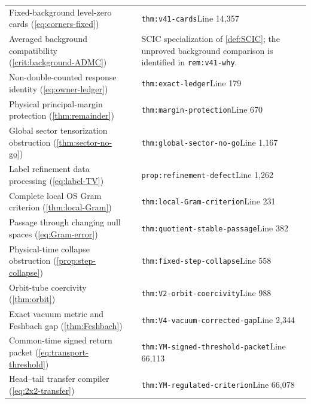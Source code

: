 \documentclass[11pt,oneside,openany]{book}
\theoremstyle{definition}
\theoremstyle{remark}
\begin{document}
\begin{longtable}{L{0.32\textwidth}L{0.12\textwidth}L{0.477\textwidth}}
Fixed-background level-zero cards (\cref{eq:corners-fixed}) & \cite{F11} & \nolinkurl{thm:v41-cards}\newline Line 14,357 \\
Averaged background compatibility (\cref{crit:background-ADMC}) & \cite{F9,F11} & SCIC specialization of \cref{def:SCIC}; the unproved background comparison is identified in \nolinkurl{rem:v41-why}. \\
Non-double-counted response identity (\cref{eq:owner-ledger}) & \cite{PAR} & \nolinkurl{thm:exact-ledger}\newline Line 179 \\
Physical principal-margin protection (\cref{thm:remainder}) & \cite{PAR} & \nolinkurl{thm:margin-protection}\newline Line 670 \\
Global sector tensorization obstruction (\cref{thm:sector-no-go}) & \cite{PAR} & \nolinkurl{thm:global-sector-no-go}\newline Line 1,167 \\
Label refinement data processing (\cref{eq:label-TV}) & \cite{PAR} & \nolinkurl{prop:refinement-defect}\newline Line 1,262 \\
Complete local OS Gram criterion (\cref{thm:local-Gram}) & \cite{F1} & \nolinkurl{thm:local-Gram-criterion}\newline Line 231 \\
Passage through changing null spaces (\cref{eq:Gram-error}) & \cite{F1} & \nolinkurl{thm:quotient-stable-passage}\newline Line 382 \\
Physical-time collapse obstruction (\cref{prop:step-collapse}) & \cite{F1} & \nolinkurl{thm:fixed-step-collapse}\newline Line 558 \\
Orbit-tube coercivity (\cref{thm:orbit}) & \cite{F1} & \nolinkurl{thm:V2-orbit-coercivity}\newline Line 988 \\
Exact vacuum metric and Feshbach gap (\cref{thm:Feshbach}) & \cite{F1} & \nolinkurl{thm:V4-vacuum-corrected-gap}\newline Line 2,344 \\
Common-time signed return packet (\cref{eq:transport-threshold}) & \cite{GT} & \nolinkurl{thm:YM-signed-threshold-packet}\newline Line 66,113 \\
Head--tail transfer compiler (\cref{eq:2x2-transfer}) & \cite{GT} & \nolinkurl{thm:YM-regulated-criterion}\newline Line 66,078 \\

\end{longtable}
\end{document}
